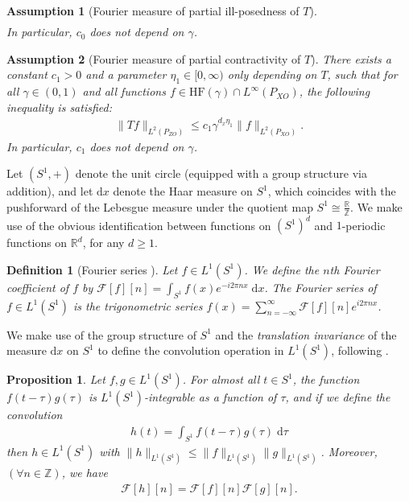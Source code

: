 \documentclass[11pt]{article}
\newcommand{\calF}{\mathcal{F}}
\newcommand{\0}{\mathbf{0}}
\newtheorem{defi}{Definition}
\newtheorem{prop}{Proposition}[section]
\newtheorem{ass}{Assumption}[section]
\begin{document}
\begin{appendix}
\begin{ass}[Fourier measure of partial ill-posedness of $T$]
\begin{align*}
    \end{align*}
    In particular, $c_0$ does not depend on $\gamma$. 
\end{ass}
\begin{ass}[Fourier measure of partial contractivity of $T$]
\label{ass:T_contractivity_schwartz}
There exists a constant $c_1>0$ and a parameter $\eta_1\in [0,\infty)$ only depending on $T$, such that for all $\gamma \in (0,1)$ and all functions $f \in \mathrm{HF}(\gamma) \cap L^\infty(P_{XO})$, the following inequality is satisfied:
    \begin{align*}
        \|Tf\|_{L^2(P_{ZO})} \leq c_1\gamma^{d_x\eta_1}\|f\|_{L^2(P_{XO})} .
    \end{align*}
    In particular, $c_1$ does not depend on $\gamma$. 
\end{ass}

Let $(S^{1}, +)$ denote the unit circle (equipped with a group structure via addition), and let $\mathrm{d}x$ denote the Haar measure on $S^{1}$, which coincides with the pushforward of the Lebesgue measure under the quotient map $S^{1}\cong \frac{\mathbb{R}}{\mathbb{Z}}$.   We make use of the obvious identification between functions on $(S^1)^{d}$ and $1$-periodic functions on $\mathbb{R}^{d}$, for any $d\geq 1$. 
\begin{defi}[Fourier series \citep{Katznelson_2004}]
    Let $f\in L^1(S^{1})$. We define the $n$th Fourier coefficient of $f$ by $\calF[f][n] = \int_{S^1} f(x)e^{-i2\pi n x}\;\mathrm{d}x$.
    The Fourier series of $f\in L^1(S^1)$ is the trigonometric series $f(x) = \sum_{n=-\infty}^{\infty}\calF[f][n]e^{i2\pi nx}$.
\end{defi}
We make use of the group structure of $S^{1}$ and the \emph{translation invariance} of the measure $\mathrm{d}x$ on $S^{1}$ to define the convolution operation in $L^1(S^{1})$, following \citep[Section 1.7]{Katznelson_2004}.
\begin{prop}
\label{prop:convolution_theorem}
    Let $f,g \in  L^1(S^{1})$. For almost all $t\in S^1$, the function $f(t - \tau)g(\tau)$ is $L^1(S^{1})$-integrable as a function of $\tau$, and if we define the convolution
    \begin{align*}
        h(t) = \int_{S^1} f(t-\tau)g(\tau)\;\mathrm{d}\tau
    \end{align*}
    then $h\in L^1(S^1)$ with $\|h\|_{L^1(S^{1})}\leq \|f\|_{L^1(S^{1})}\|g\|_{L^1(S^{1})}$. Moreover, $(\forall n\in \mathbb{Z})$, we have
    \begin{align*}
        \calF[h][n] = \calF[f][n]\calF[g][n].
    \end{align*}
\end{prop}


\end{appendix}
\end{document}
